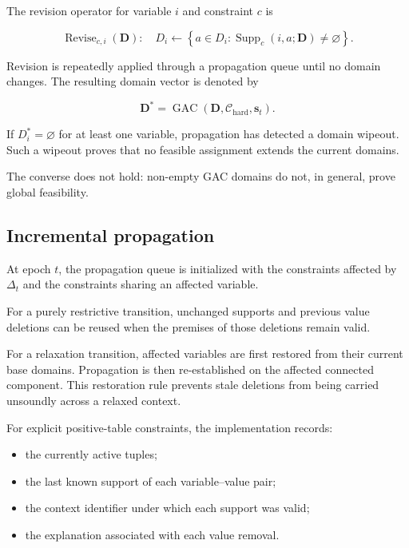 \documentclass[pdflatex,sn-mathphys-num,iicol,oneside]{sn-jnl}
\begin{document}
The revision operator for variable $i$ and constraint $c$ is

\begin{equation}
\operatorname{Revise}_{c,i}(\bm{D}):
\quad
D_i
\leftarrow
\left\{
a\in D_i:
\operatorname{Supp}_{c}(i,a;\bm{D})
\neq\varnothing
\right\}.
\label{eq:revise}
\end{equation}

Revision is repeatedly applied through a propagation queue until no
domain changes. The resulting domain vector is denoted by

\begin{equation}
\bm{D}^{*}
=
\operatorname{GAC}
\left(
\bm{D},
\mathcal{C}_{\mathrm{hard}},
\bm{s}_t
\right).
\label{eq:gac-closure}
\end{equation}

If $D_i^{*}=\varnothing$ for at least one variable, propagation has
detected a domain wipeout. Such a wipeout proves that no feasible
assignment extends the current domains.

The converse does not hold: non-empty GAC domains do not, in general,
prove global feasibility.

\subsection{Incremental propagation}

At epoch $t$, the propagation queue is initialized with the
constraints affected by $\Delta_t$ and the constraints sharing an
affected variable.

For a purely restrictive transition, unchanged supports and previous
value deletions can be reused when the premises of those deletions
remain valid.

For a relaxation transition, affected variables are first restored
from their current base domains. Propagation is then re-established
on the affected connected component. This restoration rule prevents
stale deletions from being carried unsoundly across a relaxed context.

For explicit positive-table constraints, the implementation records:

\begin{itemize}
    \item the currently active tuples;
    \item the last known support of each variable--value pair;
    \item the context identifier under which each support was valid;
    \item the explanation associated with each value removal.
\end{itemize}
\end{document}
